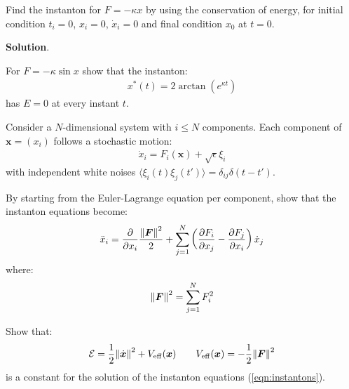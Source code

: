 \documentclass[../template.tex]{subfiles}
\begin{document}
\begin{exo}
    Find the instanton for $F = - \kappa x$ by using the conservation of energy, for initial condition $t_i = 0$, $x_i=0$, $\dot{x}_i = 0$ and final condition $x_0$ at $t=0$.

    \medskip

    \textbf{Solution}. 
\end{exo}

\begin{exo}
    For $F=-\kappa \sin x$ show that the instanton:
    \begin{align*}
        x^*(t) = 2\arctan (e^{\kappa t})
    \end{align*}
    has  $E=0$ at every instant $t$.
\end{exo}

\begin{exo}
    Consider a $N$-dimensional system with $i \leq N$ components. Each component of $\bm{x} = (x_i)$ follows a stochastic motion:
    \begin{align*}
        \dot{x}_i = F_i(\bm{x}) + \sqrt{\epsilon} \xi_i
    \end{align*}
    with independent white noises $\langle \xi_i(t) \xi_j (t')\rangle = \delta_{ij} \delta(t-t')$.

    By starting from the Euler-Lagrange equation per component, show that the instanton equations become:
    \begin{align} \label{eqn:instantons}
        \ddot{x}_i = \pdv{x_i} \frac{\norm{\bm{F}}^2}{2} + \sum_{j=1}^N \left(\pdv{F_i}{x_j} - \pdv{F_j}{x_i}\right)  \dot{x}_j
    \end{align}
    where:
    \begin{align*}
        \norm{\bm{F}}^2 = \sum_{j=1}^N F_i^2
    \end{align*}
\end{exo}

\begin{exo}
    Show that:
    \begin{align*}
        \mathcal{E}= \frac{1}{2} \norm{\dot{\bm{x}}}^2 + V_{\mathrm{eff} }(\bm{x}) \qquad V_{\mathrm{eff} }(\bm{x}) = -\frac{1}{2} \norm{\bm{F}}^2   
    \end{align*}
    is a constant for the solution of the instanton equations (\ref{eqn:instantons}).
\end{exo}
\end{document}
